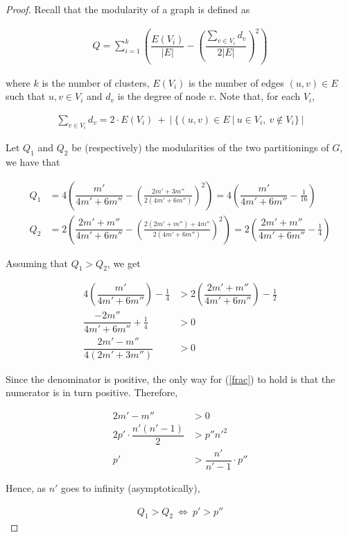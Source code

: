 \begin{proof}
	Recall that the modularity\cite{mod} of a graph is defined as
	
	\begin{align*}
		Q = \sum_{i = 1}^{k} \left( \dfrac{E(V_i)}{|E|} - \left( \dfrac{\sum_{v \in V_i} d_v}{2|E|} \right)^2 \right) 
	\end{align*}
	
	\medskip
	\noindent where $k$ is the number of clusters, $E(V_i)$ is the number of edges $(u,v) \in E$ such that $u,v \in V_i$ and $d_v$ is the degree of node $v$. Note that, for each $V_i$,
	
	\begin{align*}
		\sum_{v \in V_i} d_v = 2 \cdot E(V_i) \ + \ |\ \{(u,v) \in E \ | \ u \in V_i, \ v \notin V_i\}\ |
	\end{align*}
	
	\medskip
	\noindent Let $Q_1$ and $Q_2$ be  (respectively) the modularities of the two partitionings of $G$, we have that
	
	\begin{align*}
		Q_1 &= 4 \left( \dfrac{m'}{4m' + 6m''} - \left( \frac{2m' + 3m''}{2(4m' + 6m'')} \right)^2 \right) = 4 \left( \dfrac{m'}{4m' + 6m''} - \frac{1}{16} \right)\\
		Q_2 &= 2 \left( \dfrac{2m' + m''}{4m' + 6m''} - \left( \frac{2(2m' + m'') + 4m''}{2(4m' + 6m'')} \right)^2 \right) = 2 \left( \dfrac{2m' + m''}{4m' + 6m''} - \frac{1}{4} \right) 
	\end{align*}
	
	\medskip
	\noindent Assuming that $Q_1 > Q_2$, we get
	
	\begin{align}
		4 \left( \dfrac{m'}{4m' + 6m''} \right) - \frac{1}{4} &> 2 \left( \dfrac{2m' + m''}{4m' + 6m''} \right) - \frac{1}{2} \nonumber\\ 
		\dfrac{- 2m''}{4m' + 6m''} + \frac{1}{4} &> 0 \nonumber\\ 
		\dfrac{2m' - m''}{4(2m' + 3m'')} &> 0 \label{frac}
	\end{align}
	
	\medskip
	\noindent Since the denominator is positive, the only way for (\ref{frac}) to hold is that the numerator is in turn positive. Therefore,
	
	\begin{align*}
		2m' - m'' &> 0\\
		2p' \cdot \dfrac{n'(n'-1)}{2} &> p''n'^2\\
		p' &> \dfrac{n'}{n'-1} \cdot p''
	\end{align*}
	
	\medskip
	\noindent Hence, as $n'$ goes to infinity (asymptotically),
	
	\begin{align*}
		Q_1 > Q_2 \ \Leftrightarrow \ p' > p''
	\end{align*}
\end{proof}

